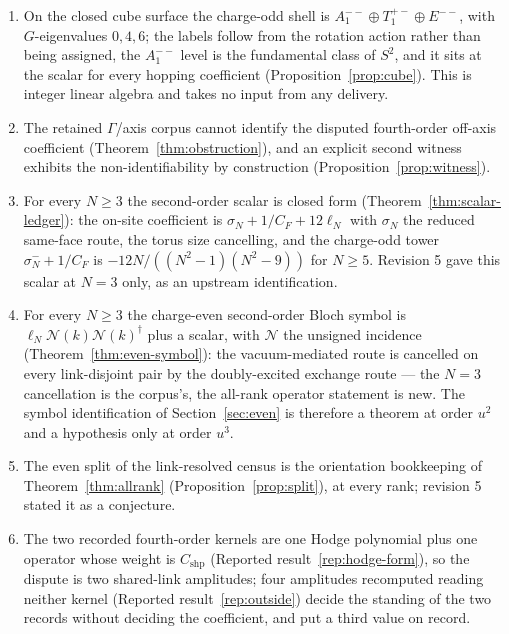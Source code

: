 \documentclass[11pt]{article}
\theoremstyle{plain}
\theoremstyle{definition}
\theoremstyle{remark}
\newcommand{\CF}{C_F}
\newcommand{\dg}{^{\dagger}}
\begin{document}
\begin{enumerate}
  remains conditional (Conditional corollary~\ref{prop:evengamma3}).
\item On the closed cube surface the charge-odd shell is
  $A_1^{--}\oplus T_1^{+-}\oplus E^{--}$, with $G$-eigenvalues $0,4,6$; the
  labels follow from the rotation action rather than being assigned, the
  $A_1^{--}$ level is the fundamental class of $S^2$, and it sits at the scalar
  for every hopping coefficient (Proposition~\ref{prop:cube}). This is integer
  linear algebra and takes no input from any delivery.
\item The retained $\Gamma$/axis corpus cannot identify the disputed
  fourth-order off-axis coefficient (Theorem~\ref{thm:obstruction}), and an
  explicit second witness exhibits the non-identifiability by construction
  (Proposition~\ref{prop:witness}).
\item For every $N\ge3$ the second-order scalar is closed form
  (Theorem~\ref{thm:scalar-ledger}): the on-site coefficient is
  $\sigma_N+1/\CF+12\ell_N$ with $\sigma_N$ the reduced same-face route, the
  torus size cancelling, and the charge-odd tower $\sigma^-_N+1/\CF$ is
  $-12N/((N^2-1)(N^2-9))$ for $N\ge5$. Revision 5 gave this scalar at $N=3$
  only, as an upstream identification.
\item For every $N\ge3$ the charge-even second-order Bloch symbol is
  $\ell_N\mathcal N(k)\mathcal N(k)\dg$ plus a scalar, with $\mathcal N$ the
  unsigned incidence (Theorem~\ref{thm:even-symbol}): the vacuum-mediated
  route is cancelled on every link-disjoint pair by the doubly-excited
  exchange route --- the $N=3$ cancellation is the corpus's, the all-rank
  operator statement is new. The symbol identification of
  Section~\ref{sec:even} is therefore a theorem at order $u^2$ and a
  hypothesis only at order $u^3$.
\item The even split of the link-resolved census is the orientation
  bookkeeping of Theorem~\ref{thm:allrank} (Proposition~\ref{prop:split}),
  at every rank; revision 5 stated it as a conjecture.
\item The two recorded fourth-order kernels are one Hodge polynomial plus one
  operator whose weight is $C_{\mathrm{shp}}$
  (Reported result~\ref{rep:hodge-form}), so the dispute is two shared-link
  amplitudes; four amplitudes recomputed reading neither kernel
  (Reported result~\ref{rep:outside}) decide the standing of the two records
  without deciding the coefficient, and put a third value on record.
\end{enumerate}
\end{document}
